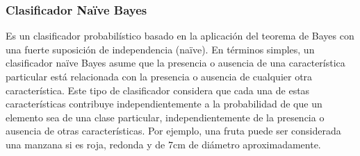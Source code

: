 \subsubsection{Clasificador Na\"{i}ve Bayes}

	Es un clasificador probabilístico basado en la aplicación del teorema de Bayes con una fuerte suposición de independencia (na\"{i}ve). En términos simples, un clasificador na\"{i}ve Bayes asume que la presencia o ausencia de una característica particular está relacionada con la presencia o ausencia de cualquier otra característica. Este tipo de clasificador considera que cada una de estas características contribuye independientemente a la probabilidad de que un elemento sea de una clase particular, independientemente de la presencia o ausencia de otras características. Por ejemplo, una fruta puede ser considerada una manzana si es roja, redonda y de 7cm de diámetro aproximadamente.

